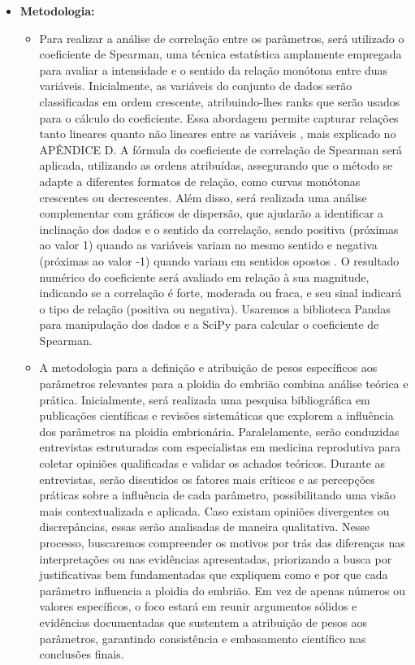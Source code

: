 \begin{itemize}
\begin{itemize}
\begin{itemize}
        \item \textbf{Metodologia:} 
        \begin{itemize}
          \item Para realizar a análise de correlação entre os parâmetros, será utilizado o coeficiente de Spearman, uma técnica estatística amplamente empregada para avaliar a intensidade e o sentido da relação monótona entre duas variáveis. Inicialmente, as variáveis do conjunto de dados serão classificadas em ordem crescente, atribuindo-lhes ranks que serão usados para o cálculo do coeficiente. Essa abordagem permite capturar relações tanto lineares quanto não lineares entre as variáveis \cite{sousa2019}, mais explicado no APÊNDICE D. A fórmula do coeficiente de correlação de Spearman será aplicada, utilizando as ordens atribuídas, assegurando que o método se adapte a diferentes formatos de relação, como curvas monótonas crescentes ou decrescentes. Além disso, será realizada uma análise complementar com gráficos de dispersão, que ajudarão a identificar a inclinação dos dados e o sentido da correlação, sendo positiva (próximas ao valor 1) quando as variáveis variam no mesmo sentido e negativa (próximas ao valor -1) quando variam em sentidos opostos \cite{sousa2019}. O resultado numérico do coeficiente será avaliado em relação à sua magnitude, indicando se a correlação é forte, moderada ou fraca, e seu sinal indicará o tipo de relação (positiva ou negativa). Usaremos a biblioteca Pandas para manipulação dos dados e a SciPy para calcular o coeficiente de Spearman.
          \item A metodologia para a definição e atribuição de pesos específicos aos parâmetros relevantes para a ploidia do embrião combina análise teórica e prática. Inicialmente, será realizada uma pesquisa bibliográfica em publicações científicas e revisões sistemáticas que explorem a influência dos parâmetros na ploidia embrionária. Paralelamente, serão conduzidas entrevistas estruturadas com especialistas em medicina reprodutiva para coletar opiniões qualificadas e validar os achados teóricos. Durante as entrevistas, serão discutidos os fatores mais críticos e as percepções práticas sobre a influência de cada parâmetro, possibilitando uma visão mais contextualizada e aplicada. Caso existam opiniões divergentes ou discrepâncias, essas serão analisadas de maneira qualitativa. Nesse processo, buscaremos compreender os motivos por trás das diferenças nas interpretações ou nas evidências apresentadas, priorizando a busca por justificativas bem fundamentadas que expliquem como e por que cada parâmetro influencia a ploidia do embrião. Em vez de apenas números ou valores específicos, o foco estará em reunir argumentos sólidos e evidências documentadas que sustentem a atribuição de pesos aos parâmetros, garantindo consistência e embasamento científico nas conclusões finais.
        \end{itemize}


\end{itemize}
\end{itemize}
\end{itemize}
